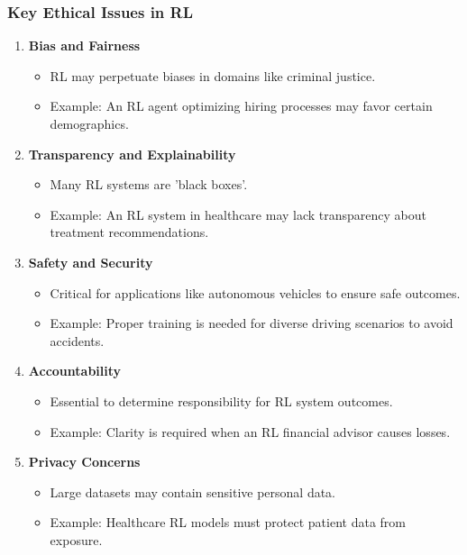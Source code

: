 \documentclass{beamer}
\begin{document}
\begin{frame}[fragile]
    \frametitle{Key Ethical Issues in RL}
    \begin{enumerate}
        \item \textbf{Bias and Fairness}
            \begin{itemize}
                \item RL may perpetuate biases in domains like criminal justice.
                \item Example: An RL agent optimizing hiring processes may favor certain demographics.
            \end{itemize}

        \item \textbf{Transparency and Explainability}
            \begin{itemize}
                \item Many RL systems are 'black boxes'.
                \item Example: An RL system in healthcare may lack transparency about treatment recommendations.
            \end{itemize}
            
        \item \textbf{Safety and Security}
            \begin{itemize}
                \item Critical for applications like autonomous vehicles to ensure safe outcomes.
                \item Example: Proper training is needed for diverse driving scenarios to avoid accidents.
            \end{itemize}
            
        \item \textbf{Accountability}
            \begin{itemize}
                \item Essential to determine responsibility for RL system outcomes.
                \item Example: Clarity is required when an RL financial advisor causes losses.
            \end{itemize}

        \item \textbf{Privacy Concerns}
            \begin{itemize}
                \item Large datasets may contain sensitive personal data.
                \item Example: Healthcare RL models must protect patient data from exposure.
            \end{itemize}
    \end{enumerate}
\end{frame}
\end{document}
